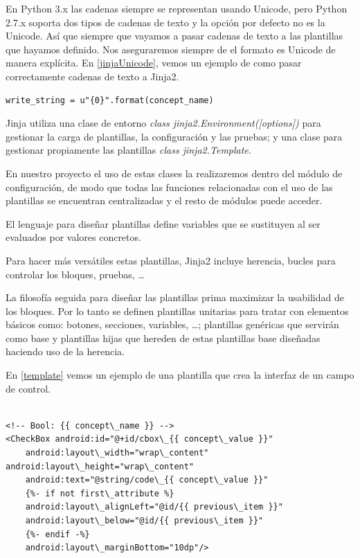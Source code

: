 En Python 3.x las cadenas siempre se representan usando Unicode, pero  Python 2.7.x soporta dos tipos de cadenas de texto y la opción por defecto no es la Unicode. Así que siempre que vayamos a pasar cadenas de texto a las plantillas que hayamos definido. Nos aseguraremos siempre de el formato es Unicode de manera explícita. En \ref{jinjaUnicode}, vemos un ejemplo de como pasar correctamente cadenas de texto a Jinja2.\par


\begin{lstlisting}[label=jinjaUnicode,caption=Cadena de texto Unicode para Jinja2]
    write_string = u"{0}".format(concept_name)
\end{lstlisting}

Jinja utiliza una clase de entorno \emph{class jinja2.Environment([options])} para gestionar la carga de plantillas, la configuración y las pruebas; y una clase para gestionar propiamente las plantillas \emph{class jinja2.Template}.\par 
En nuestro proyecto el uso de estas clases la realizaremos dentro del módulo de configuración, de modo que todas las funciones relacionadas con el uso de las plantillas se encuentran centralizadas y el resto de módulos puede acceder.\medskip\par 

El lenguaje para diseñar plantillas define variables que se sustituyen al ser evaluados por valores concretos.\par
Para hacer más versátiles estas plantillas, Jinja2 incluye herencia, bucles para controlar los bloques, pruebas,  \ldots\par
La filosofía seguida para diseñar las plantillas prima maximizar la usabilidad de los bloques. Por lo tanto se definen plantillas unitarias para tratar con elementos básicos como: botones, secciones, variables, \ldots ; plantillas genéricas que servirán como base y plantillas hijas que hereden de estas plantillas base diseñadas haciendo uso de la herencia.\par
En \ref{template} vemos un ejemplo de una plantilla que crea la interfaz de un campo de control.\medskip\par

\lstset{escapechar=@,style=python}

\begin{lstlisting}[label=template,caption=Plantilla Jinja2]

<!-- Bool: {{ concept\_name }} -->           
<CheckBox android:id="@+id/cbox\_{{ concept\_value }}"
    android:layout\_width="wrap\_content" android:layout\_height="wrap\_content"
    android:text="@string/code\_{{ concept\_value }}"
    {%- if not first\_attribute %}
    android:layout\_alignLeft="@id/{{ previous\_item }}" 
    android:layout\_below="@id/{{ previous\_item }}"
    {%- endif -%}
    android:layout\_marginBottom="10dp"/>

\end{lstlisting}

